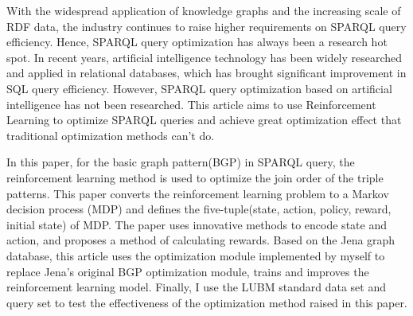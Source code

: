 \begin{eabstract}
    With the widespread application of knowledge graphs and the increasing scale of RDF data, the industry continues to raise higher requirements on SPARQL query efficiency. Hence, SPARQL query optimization has always been a research hot spot. In recent years, artificial intelligence technology has been widely researched and applied in relational databases, which has brought significant improvement in SQL query efficiency. However, SPARQL query optimization based on artificial intelligence has not been researched. This article aims to use Reinforcement Learning to optimize SPARQL queries and achieve great optimization effect that traditional optimization methods can't do. 
    
    In this paper, for the basic graph pattern(BGP) in SPARQL query, the reinforcement learning method is used to optimize the join order of the triple patterns. This paper converts the reinforcement learning problem to a Markov decision process (MDP) and defines the five-tuple(state, action, policy, reward, initial state) of MDP. The paper uses innovative methods to encode state and action, and proposes a method of calculating rewards. Based on the Jena graph database, this article uses the optimization module implemented by myself to replace Jena's original BGP optimization module, trains and improves the reinforcement learning model. Finally, I use the LUBM standard data set and query set to test the effectiveness of the optimization method raised in this paper.
\end{eabstract}
